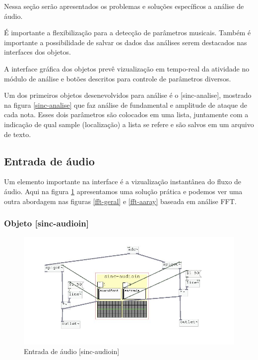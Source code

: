 \documentclass[draft]{ppgmus}
\begin{document}
Nessa seção serão apresentados os problemas e soluções específicos
a análise de áudio. 

É importante a flexibilização para a detecção de parâmetros musicais.
Também é importante a possibilidade de salvar os dados das análises serem
destacados nas interfaces dos objetos.

A interface gráfica dos objetos prevê vizualização em tempo-real
da atividade no módulo de análise e botões descritos para controle
de parâmetros diversos.

Um dos primeiros objetos desenevolvidos para análise é o [sinc-analise],
mostrado na figura \ref{sinc-analise} que faz análise de fundamental e amplitude
de ataque de cada nota. Esses dois parâmetros são colocados em uma lista, juntamente com a indicação
de qual sample (localização) a lista se refere e são salvos em um arquivo de texto.



\subsection{Entrada de áudio}

Um elemento importante na interface é a vizualização instantânea
do fluxo de áudio. Aqui na figura \ref{audioin} apresentamos uma solução prática e podemos
ver uma outra abordagem nas figuras \ref{fft-geral} e \ref{fft-aaray} baseada em análise FFT.

\subsubsection{Objeto [sinc-audioin]}


\begin{figure}
\includegraphics[scale=.55]{audioin}
\caption{Entrada de áudio [sinc-audioin]}
\label{audioin}
\end{figure}
\end{document}
